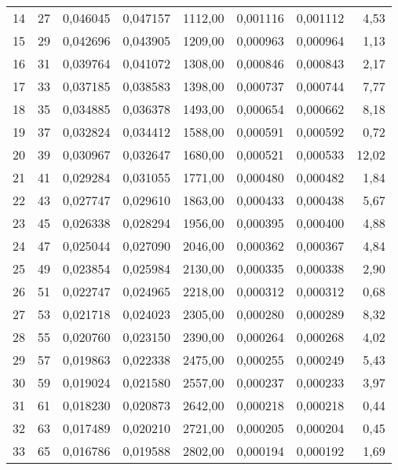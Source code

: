 \begin{center}
\begin{tabular}{l | c | c c r | c c r}
        14 &      27 &  0,046045 &  0,047157 & 1112,00 & 0,001116 &  0,001112 &    4,53 \\
        15 &      29 &  0,042696 &  0,043905 & 1209,00 & 0,000963 &  0,000964 &    1,13 \\
        16 &      31 &  0,039764 &  0,041072 & 1308,00 & 0,000846 &  0,000843 &    2,17 \\
        17 &      33 &  0,037185 &  0,038583 & 1398,00 & 0,000737 &  0,000744 &    7,77 \\
        18 &      35 &  0,034885 &  0,036378 & 1493,00 & 0,000654 &  0,000662 &    8,18 \\
        19 &      37 &  0,032824 &  0,034412 & 1588,00 & 0,000591 &  0,000592 &    0,72 \\
        20 &      39 &  0,030967 &  0,032647 & 1680,00 & 0,000521 &  0,000533 &   12,02 \\
        21 &      41 &  0,029284 &  0,031055 & 1771,00 & 0,000480 &  0,000482 &    1,84 \\
        22 &      43 &  0,027747 &  0,029610 & 1863,00 & 0,000433 &  0,000438 &    5,67 \\
        23 &      45 &  0,026338 &  0,028294 & 1956,00 & 0,000395 &  0,000400 &    4,88 \\
        24 &      47 &  0,025044 &  0,027090 & 2046,00 & 0,000362 &  0,000367 &    4,84 \\
        25 &      49 &  0,023854 &  0,025984 & 2130,00 & 0,000335 &  0,000338 &    2,90 \\
        26 &      51 &  0,022747 &  0,024965 & 2218,00 & 0,000312 &  0,000312 &    0,68 \\
        27 &      53 &  0,021718 &  0,024023 & 2305,00 & 0,000280 &  0,000289 &    8,32 \\
        28 &      55 &  0,020760 &  0,023150 & 2390,00 & 0,000264 &  0,000268 &    4,02 \\
        29 &      57 &  0,019863 &  0,022338 & 2475,00 & 0,000255 &  0,000249 &    5,43 \\
        30 &      59 &  0,019024 &  0,021580 & 2557,00 & 0,000237 &  0,000233 &    3,97 \\
        31 &      61 &  0,018230 &  0,020873 & 2642,00 & 0,000218 &  0,000218 &    0,44 \\
        32 &      63 &  0,017489 &  0,020210 & 2721,00 & 0,000205 &  0,000204 &    0,45 \\
        33 &      65 &  0,016786 &  0,019588 & 2802,00 & 0,000194 &  0,000192 &    1,69 \\

\end{tabular}
\end{center}
